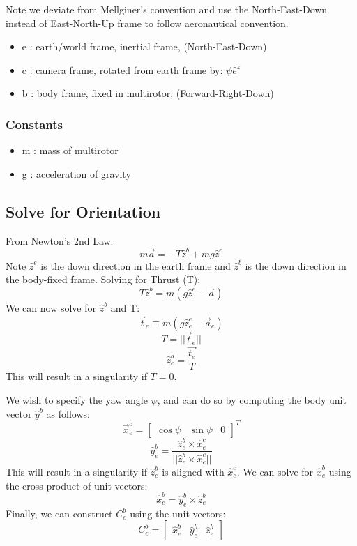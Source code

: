 \documentclass[10pt]{article}
\begin{document}
Note we deviate from Mellginer's convention and use the North-East-Down instead of
East-North-Up frame to follow aeronautical convention.

\begin{itemize}
    \item e : earth/world frame, inertial frame, (North-East-Down)
    \item c : camera frame, rotated from earth frame by: $\psi \hat{e}^z$
    \item b : body frame, fixed in multirotor, (Forward-Right-Down)
\end{itemize}

\subsubsection*{Constants}
\begin{itemize}
    \item m : mass of multirotor
    \item g : acceleration of gravity
\end{itemize}


\subsection{Solve for Orientation}


From Newton's 2nd Law:
%
$$m\vec{a} = -T \hat{z}^b + m g \hat{z}^e$$
Note $\hat{z}^e$ is the down direction in the earth frame and $\hat{z}^b$ is the down direction in the body-fixed frame.
%
Solving for Thrust (T):
%
$$T \hat{z}^b = m (g \hat{z}^e - \vec{a})$$
%
We can now solve for $\hat{z}^b$ and T:
%
$$\vec{t}_e \equiv m(g \hat{z}^e_e - \vec{a}_e)$$
%
$$T = ||\vec{t}_e||$$
%
$$\hat{z}^b_e = \dfrac{\vec{t_e}}{T}$$
%
This will result in a singularity if $T = 0$.


We wish to specify the yaw angle $\psi$, and can do so by computing the body unit vector $\hat{y}^b$ as follows:
%
$$\vec{x}^c_e = \begin{bmatrix} \cos{\psi} & \sin{\psi} & 0 \end{bmatrix}^T$$
%
$$\hat{y}^b_e = \dfrac{\hat{z}^b_e \times \hat{x}^c_e}{||\hat{z}^b_e \times \hat{x}^c_e||}$$
This will result in a singularity if $\hat{z}^b_e$ is aligned with $\hat{x}^c_e$.
%
We can solve for $\hat{x}^b_e$ using the cross product of unit vectors:
%
$$\hat{x}^b_e = \hat{y}^b_e \times \hat{z}^b_e$$
%
Finally, we can construct $C^b_e$ using the unit vectors:
%
$$C^b_e = \begin{bmatrix} \hat{x}^b_e & \hat{y}^b_e & \hat{z}^b_e \end{bmatrix}$$
\end{document}
